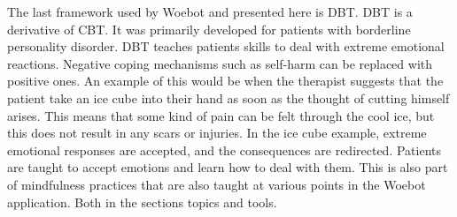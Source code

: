 The last framework used by Woebot and presented here is DBT.
DBT is a derivative of CBT\cite{comparison-dbt}.
It was primarily developed for patients with borderline personality disorder.
DBT teaches patients skills to deal with extreme emotional reactions.
Negative coping mechanisms such as self-harm can be replaced with positive ones.
An example of this would be when the therapist suggests that the patient take an ice cube into their hand as soon as the thought of cutting himself arises.
This means that some kind of pain can be felt through the cool ice, but this does not result in any scars or injuries.
In the ice cube example, extreme emotional responses are accepted, and the consequences are redirected.
Patients are taught to accept emotions and learn how to deal with them.
This is also part of mindfulness practices that are also taught at various points in the Woebot application.
Both in the sections topics and tools.
